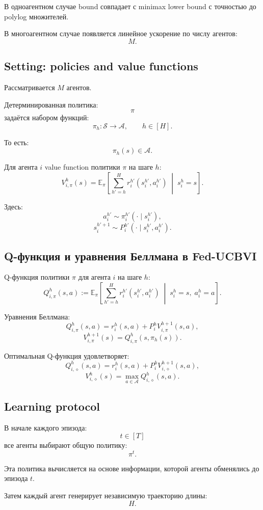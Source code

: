 \documentclass[12pt,a4paper]{article}
\begin{document}
В одноагентном случае bound совпадает с minimax lower bound с точностью до polylog множителей.

В многоагентном случае появляется линейное ускорение по числу агентов:
\[
M.
\]

\subsection{Setting: policies and value functions}

Рассматривается $M$ агентов.

Детерминированная политика:
\[
\pi
\]
задаётся набором функций:
\[
\pi_h:\mathcal S\to\mathcal A,
\qquad
h\in[H].
\]

То есть:
\[
\pi_h(s)\in\mathcal A.
\]

Для агента $i$ value function политики $\pi$ на шаге $h$:
\[
V^h_{i,\pi}(s)
=
\mathbb E_\pi
\left[
\sum_{h'=h}^{H}
r_i^{h'}(s_i^{h'},a_i^{h'})
\;\middle|\;
s_i^h=s
\right].
\]

Здесь:
\[
a_i^{h'}\sim \pi_i^{h'}(\cdot\mid s_i^{h'}),
\]
\[
s_i^{h'+1}
\sim
P_i^{h'}(\cdot\mid s_i^{h'},a_i^{h'}).
\]

\subsection{Q-функция и уравнения Беллмана в Fed-UCBVI}

Q-функция политики $\pi$ для агента $i$ на шаге $h$:
\[
Q^h_{i,\pi}(s,a)
:=
\mathbb E_\pi
\left[
\sum_{h'=h}^{H}
r_i^{h'}(s_i^{h'},a_i^{h'})
\;\middle|\;
s_i^h=s,\;a_i^h=a
\right].
\]

Уравнения Беллмана:
\[
Q^h_{i,\pi}(s,a)
=
r_i^h(s,a)
+
P_i^h V_{i,\pi}^{h+1}(s,a),
\]
\[
V_{i,\pi}^{h+1}(s)
=
Q^h_{i,\pi}(s,\pi_h(s)).
\]

Оптимальная Q-функция удовлетворяет:
\[
Q^h_{i,\diamond}(s,a)
=
r_i^h(s,a)
+
P_i^h V_{i,\diamond}^{h+1}(s,a),
\]
\[
V^h_{i,\diamond}(s)
=
\max_{a\in\mathcal A}
Q^h_{i,\diamond}(s,a).
\]

\subsection{Learning protocol}

В начале каждого эпизода:
\[
t\in[T]
\]
все агенты выбирают общую политику:
\[
\pi^t.
\]

Эта политика вычисляется на основе информации, которой агенты обменялись до эпизода $t$.

Затем каждый агент генерирует независимую траекторию длины:
\[
H.
\]
\end{document}
